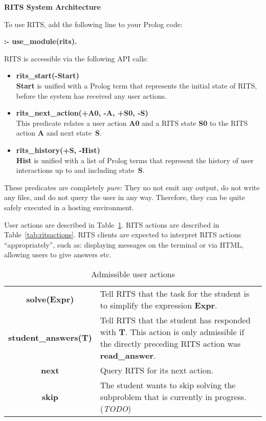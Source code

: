 \documentclass[a4paper,11pt]{article}
\begin{document}
\noindent
\begin{center}
\Large\textbf{RITS System Architecture}
\end{center}

\vspace{1cm}
\noindent
To use RITS, add the following line to your Prolog code:

\bigskip
\textbf{:- use\_module(rits).}
\bigskip

\noindent RITS is accessible via the following API calls:

\begin{itemize}
\item \textbf{rits\_start(-Start)}\\\textbf{Start} is unified with a
  Prolog term that represents the initial state of RITS, before the
  system has received any user actions.

\item \textbf{rits\_next\_action(+A0, -A, +S0, -S)}\\
  This predicate relates a user action \textbf{A0} and a RITS state
  \textbf{S0} to the RITS action \textbf{A} and next state~\textbf{S}.

\item \textbf{rits\_history(+S, -Hist)}\\
  \textbf{Hist} is unified with a list of Prolog terms that represent
  the history of user interactions up to and including state~\textbf{S}.
\end{itemize}

These predicates are completely \textit{pure}: They no not emit any
output, do not write any files, and do not query the user in any way.
Therefore, they can be quite safely executed in a hosting environment.

User actions are described in Table~\ref{tab:useractions}. RITS
actions are described in Table~\ref{tab:ritsactions}. RITS clients are
expected to interpret RITS actions ``appropriately'', such as:
displaying messages on the terminal or via HTML, allowing users to
give answers etc.

\begin{table}[ht]
  \centering
  \begin{tabular}{cp{7cm}}
    \hline
    \textbf{solve(Expr)} & Tell RITS that the task for the student is to simplify  the expression \textbf{Expr}.\\
    \textbf{student\_answers(T)} & Tell RITS that the student has responded with \textbf{T}. This action is only admissible if the directly preceding RITS action was \textbf{read\_answer}.\\
    \textbf{next} & Query RITS for its next action. \\
    \textbf{skip} & The student wants to skip solving the subproblem that is
    currently in progress. (\textit{TODO})\\
    \hline
  \end{tabular}
\caption{Admissible user actions}
  \label{tab:useractions}
\end{table}
\end{document}
